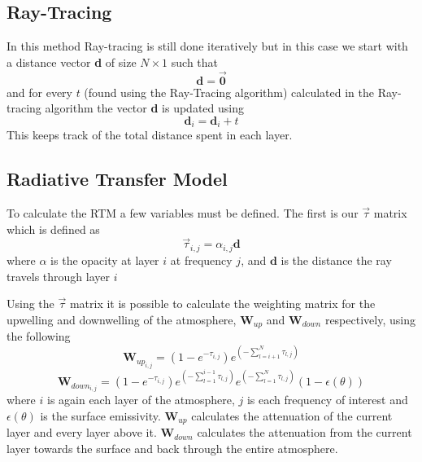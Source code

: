 \subsection{Ray-Tracing}
In this method Ray-tracing is still done iteratively but in this case we start with a distance vector \textbf{d} of size $N \times 1$ such that
\begin{equation*}
\textbf{d} = \vec{\textbf{0}}
\end{equation*}
and for every $t$ (found using the Ray-Tracing algorithm) calculated in the Ray-tracing algorithm the vector \textbf{d} is updated using
\begin{equation}
\textbf{d}_i = \textbf{d}_i + t 
\end{equation}
This keeps track of the total distance spent in each layer.

\subsection{Radiative Transfer Model}

To calculate the RTM a few variables must be defined. The first is our $\vec{\tau}$ matrix which is defined as
\begin{equation}
\vec{\tau}_{i,j} = \alpha_{i,j} \textbf{d}
\end{equation}
where $\alpha$ is the opacity at layer $i$ at frequency $j$, and $\textbf{d}$ is the distance the ray travels through layer $i$

Using the $\vec{\tau}$ matrix it is possible to calculate the weighting matrix for the upwelling and downwelling of the atmosphere, $\textbf{W}_{up}$ and $\textbf{W}_{down}$ respectively, using the following
\begin{equation}
\textbf{W}_{up_{i,j}} = (1-e^{-\tau_{i,j}})e^{\left(-\sum_{l=i+1}^N \tau_{l,j}\right)}
\end{equation}
\begin{equation}
\textbf{W}_{down_{i,j}} = (1-e^{-\tau_{i,j}})e^{\left(-\sum_{l=1}^{i-1} \tau_{l,j}\right)} e^{\left(-\sum_{l=1}^{N} \tau_{l,j}\right)} (1- \epsilon(\theta))
\end{equation}
where $i$ is again each layer of the atmosphere, $j$ is each frequency of interest and $\epsilon(\theta)$ is the surface emissivity. $\textbf{W}_{up}$ calculates the attenuation of the current layer and every layer above it. $\textbf{W}_{down}$ calculates the attenuation from the current layer towards the surface and back through the entire atmosphere. 

